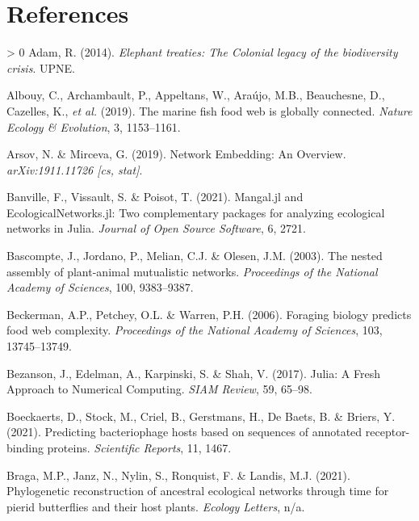 \documentclass[10pt,oneside]{article}
\newlength{\cslhangindent}
\newenvironment{CSLReferences}[3] %
 {%
  \setlength{\parindent}{0pt}
  \ifodd #1 \everypar{\setlength{\hangindent}{\cslhangindent}}\ignorespaces\fi
  \ifnum #2 > 0
  \setlength{\parskip}{#2\baselineskip}
  \fi
 }%
 {}
\begin{document}
\hypertarget{references}{%
\section*{References}\label{references}}

\hypertarget{refs}{}
\begin{CSLReferences}{1}{0}
\leavevmode\hypertarget{ref-Adam2014EleTre}{}%
Adam, R. (2014). \emph{Elephant treaties: The Colonial legacy of the
biodiversity crisis}. UPNE.

\leavevmode\hypertarget{ref-Albouy2019MarFis}{}%
Albouy, C., Archambault, P., Appeltans, W., Araújo, M.B., Beauchesne,
D., Cazelles, K., \emph{et al.} (2019). The marine fish food web is
globally connected. \emph{Nature Ecology \& Evolution}, 3, 1153--1161.

\leavevmode\hypertarget{ref-Arsov2019NetEmb}{}%
Arsov, N. \& Mirceva, G. (2019). Network Embedding: An Overview.
\emph{arXiv:1911.11726 {[}cs, stat{]}}.

\leavevmode\hypertarget{ref-Banville2021ManJl}{}%
Banville, F., Vissault, S. \& Poisot, T. (2021). Mangal.jl and
EcologicalNetworks.jl: Two complementary packages for analyzing
ecological networks in Julia. \emph{Journal of Open Source Software}, 6,
2721.

\leavevmode\hypertarget{ref-Bascompte2003NesAss}{}%
Bascompte, J., Jordano, P., Melian, C.J. \& Olesen, J.M. (2003). The
nested assembly of plant-animal mutualistic networks. \emph{Proceedings
of the National Academy of Sciences}, 100, 9383--9387.

\leavevmode\hypertarget{ref-Beckerman2006ForBio}{}%
Beckerman, A.P., Petchey, O.L. \& Warren, P.H. (2006). Foraging biology
predicts food web complexity. \emph{Proceedings of the National Academy
of Sciences}, 103, 13745--13749.

\leavevmode\hypertarget{ref-Bezanson2017JulFre}{}%
Bezanson, J., Edelman, A., Karpinski, S. \& Shah, V. (2017). Julia: A
Fresh Approach to Numerical Computing. \emph{SIAM Review}, 59, 65--98.

\leavevmode\hypertarget{ref-Boeckaerts2021PreBac}{}%
Boeckaerts, D., Stock, M., Criel, B., Gerstmans, H., De Baets, B. \&
Briers, Y. (2021). Predicting bacteriophage hosts based on sequences of
annotated receptor-binding proteins. \emph{Scientific Reports}, 11,
1467.

\leavevmode\hypertarget{ref-Braga2021PhyRec}{}%
Braga, M.P., Janz, N., Nylin, S., Ronquist, F. \& Landis, M.J. (2021).
Phylogenetic reconstruction of ancestral ecological networks through
time for pierid butterflies and their host plants. \emph{Ecology
Letters}, n/a.


\end{CSLReferences}
\end{document}
